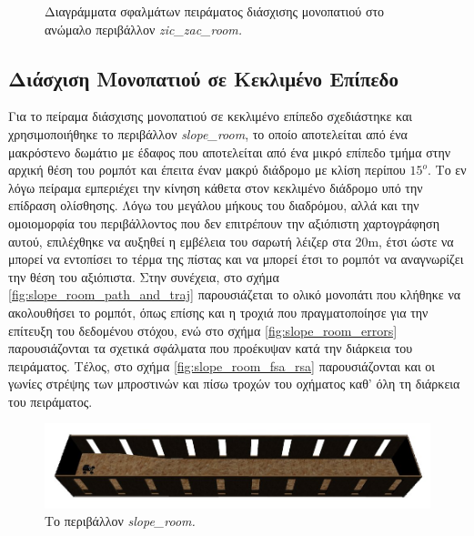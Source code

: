 \begin{figure}[!ht]
	\caption{Διαγράμματα σφαλμάτων πειράματος διάσχισης μονοπατιού στο ανώμαλο περιβάλλον \textit{zic{\_}zac{\_}room.}}
	\label{fig:zic_zac_room_errors}
\end{figure}

\FloatBarrier

\subsection{Διάσχιση Μονοπατιού σε Κεκλιμένο Επίπεδο}
Για το πείραμα διάσχισης μονοπατιού σε κεκλιμένο επίπεδο σχεδιάστηκε και χρησιμοποιήθηκε το περιβάλλον \textit{slope{\_}room}, το οποίο αποτελείται από ένα μακρόστενο δωμάτιο με έδαφος που αποτελείται από ένα μικρό επίπεδο τμήμα στην αρχική θέση του ρομπότ και έπειτα έναν μακρύ διάδρομο με κλίση περίπου $15^o$. Το εν λόγω πείραμα εμπεριέχει την κίνηση κάθετα στον κεκλιμένο διάδρομο υπό την επίδραση ολίσθησης. Λόγω του μεγάλου μήκους του διαδρόμου, αλλά και την ομοιομορφία του περιβάλλοντος που δεν επιτρέπουν την αξιόπιστη χαρτογράφηση αυτού, επιλέχθηκε να αυξηθεί η εμβέλεια του σαρωτή λέιζερ στα 20m, έτσι ώστε να μπορεί να εντοπίσει το τέρμα της πίστας και να μπορεί έτσι το ρομπότ να αναγνωρίζει την θέση του αξιόπιστα. Στην συνέχεια, στο σχήμα \ref{fig:slope_room_path_and_traj} παρουσιάζεται το ολικό μονοπάτι που κλήθηκε να ακολουθήσει το ρομπότ, όπως επίσης και η τροχιά που πραγματοποίησε για την επίτευξη του δεδομένου στόχου, ενώ στο σχήμα \ref{fig:slope_room_errors} παρουσιάζονται τα σχετικά σφάλματα που προέκυψαν κατά την διάρκεια του πειράματος. Τέλος, στο σχήμα \ref{fig:slope_room_fsa_rsa} παρουσιάζονται και οι γωνίες στρέψης των μπροστινών και πίσω τροχών του οχήματος καθ' όλη τη διάρκεια του πειράματος.

\begin{figure}[!ht]
	\centering
	\includegraphics[width=\linewidth]{Chapters/Chapter5/Figures/ptc_experiments/slope_room.jpg}
	\caption{Το περιβάλλον \textit{slope{\_}room.}}
	\label{fig:slope_room}
\end{figure}	
	
